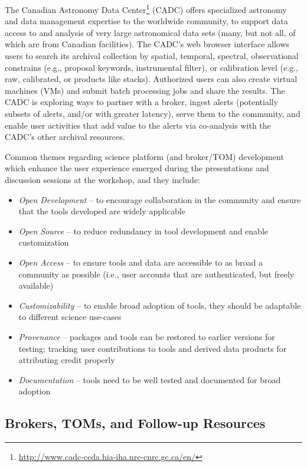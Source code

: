 The Canadian Astronomy Data Center\footnote{\url{http://www.cadc-ccda.hia-iha.nrc-cnrc.gc.ca/en/}} (CADC) offers specialized astronomy and data management expertise to the worldwide community, to support data access to and analysis of very large astronomical data sets (many, but not all, of which are from Canadian facilities).
The CADC's web browser interface allows users to search its archival collection by spatial, temporal, spectral, observational constrains (e.g., proposal keywords, instrumental filter), or calibration level (e.g., raw, calibrated, or products like stacks).
Authorized users can also create virtual machines (VMs) and submit batch processing jobs and share the results.
The CADC is exploring ways to partner with a broker, ingest alerts (potentially subsets of alerts, and/or with greater latency), serve them to the community, and enable user activities that add value to the alerts via co-analysis with the CADC's other archival resources.

Common themes regarding science platform (and broker/TOM) development which enhance the user experience emerged during the presentations and discussion sessions at the workshop, and they include:
\begin{itemize}
\item {\it Open Development} -- to encourage collaboration in the community and ensure that the tools developed are widely applicable
\item {\it Open Source} -- to reduce redundancy in tool development and enable customization
\item {\it Open Access} -- to ensure tools and data are accessible to as broad a community as possible (i.e., user accounts that are authenticated, but freely available)
\item {\it Customizability} -- to enable broad adoption of tools, they should be adaptable to different science use-cases
\item {\it Provenance} -- packages and tools can be restored to earlier versions for testing; tracking user contributions to tools and derived data products for attributing credit properly
\item {\it Documentation} -- tools need to be well tested and documented for broad adoption
\end{itemize}

\subsection{Brokers, TOMs, and Follow-up Resources}\label{ssec:interfaces_brokers}

